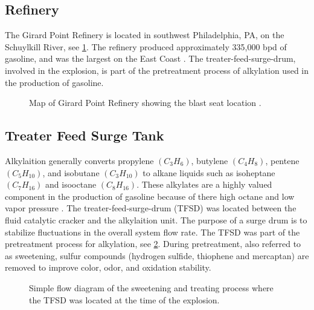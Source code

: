\documentclass[10pt,parskip=half,
toc=sectionentrywithdots,
bibliography=totocnumbered,
captions=tableheading,numbers=noendperiod]{scrartcl}
\begin{document}
\hypertarget{refinery}{%
\subsection{Refinery}\label{refinery}}

The Girard Point Refinery is located in southwest Philadelphia, PA, on
the Schuylkill River, see \cref{fig:map}. The refinery produced
approximately 335,000 bpd of gasoline, and was the largest on the East
Coast \cite{AssociatedPress2019}. The treater-feed-surge-drum, involved
in the explosion, is part of the pretreatment process of alkylation used
in the production of gasoline.

\begin{figure}[H]
\hypertarget{fig:map}{%
\begin{center}
\end{center}
\caption{Map of Girard Point Refinery showing the blast seat location
\cite{Duchneskie2019}.}\label{fig:map}
}
\end{figure}

\hypertarget{treater-feed-surge-tank}{%
\subsection{Treater Feed Surge Tank}\label{treater-feed-surge-tank}}

Alkylaition generally converts propylene \((C_3H_6)\), butylene
\((C_4H_8)\), pentene \((C_5H_{10})\), and isobutane \((C_3H_{10})\) to
alkane liquids such as isoheptane \((C_7H_{16})\) and isooctane
\((C_8H_{16})\). These alkylates are a highly valued component in the
production of gasoline because of there high octane and low vapor
pressure \cite{flowserve2000}. The treater-feed-surge-drum (TFSD) was
located between the fluid catalytic cracker and the alkylaition unit.
The purpose of a surge drum is to stabilize fluctuations in the overall
system flow rate. The TFSD was part of the pretreatment process for
alkylation, see \cref{fig:fig_process_flow}. During pretreatment, also
referred to as sweetening, sulfur compounds (hydrogen sulfide, thiophene
and mercaptan) are removed to improve color, odor, and oxidation
stability.

\begin{figure}[H]
\hypertarget{fig:fig_process_flow}{%
\begin{center}
\end{center}
\caption{Simple flow diagram of the sweetening and treating process where the
TFSD was located at the time of the explosion.
\cite{Temur2014,Malone2019}}\label{fig:fig_process_flow}
}
\end{figure}
\end{document}
